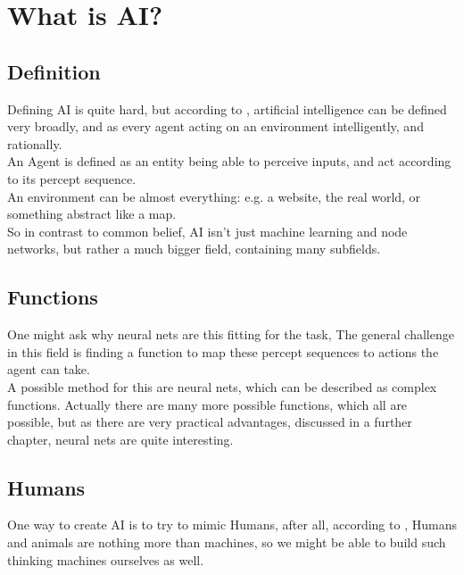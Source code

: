 \chapter{What is AI?}

\section{Definition}{ Defining AI is quite hard, but according to \cite{russellArtificialIntelligenceModern2010}, artificial intelligence can be defined very broadly, and as every agent acting on an environment intelligently, and rationally.\\An Agent is defined as an entity being able to perceive inputs, and act according to its percept sequence.\\ An environment can be almost everything: e.g. a website, the real world, or something abstract like a map.\\ So in contrast to common belief, AI isn't just machine learning and node networks, but rather a much bigger field, containing many subfields.}
\section{Functions}{ One might ask why neural nets are this fitting for the task,  The general challenge in this field is finding a function to map these percept sequences to actions the agent can take. \\ A possible method for this are neural nets, which can be described as complex functions. Actually there are many more possible functions, which all are possible, but as there are very practical advantages, discussed in a further chapter, neural nets are quite interesting.}
\section{Humans}{
One way to create AI is to try to mimic Humans, after all, according to \cite[page 6]{russellArtificialIntelligenceModern2010}, Humans and animals are nothing more than machines, so we might be able to build such thinking machines ourselves as well.
}